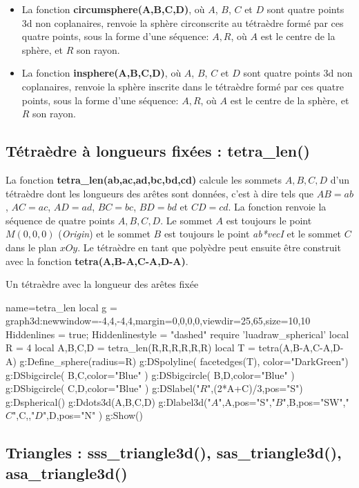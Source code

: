 \begin{itemize}
    \item La fonction \textbf{circumsphere(A,B,C,D)}, où $A$, $B$, $C$ et $D$ sont quatre points 3d non coplanaires, renvoie la sphère circonscrite au tétraèdre formé par ces quatre points, sous la forme d'une séquence: $A,R$, où $A$ est le centre de la sphère, et $R$ son rayon.
    \item La fonction \textbf{insphere(A,B,C,D)}, où $A$, $B$, $C$ et $D$ sont quatre points 3d non coplanaires, renvoie la sphère inscrite dans le tétraèdre formé par ces quatre points, sous la forme d'une séquence: $A,R$, où $A$ est le centre de la sphère, et $R$ son rayon.
\end{itemize}

\subsection{Tétraèdre à longueurs fixées : tetra\_len()}

La fonction \textbf{tetra\_len(ab,ac,ad,bc,bd,cd)} calcule les sommets $A,B,C,D$ d'un tétraèdre dont les longueurs des arêtes sont données, c'est à dire tels que $AB=ab$, $AC=ac$, $AD=ad$, $BC=bc$, $BD=bd$ et $CD=cd$. La fonction renvoie la séquence de quatre points $A,B,C,D$. Le sommet $A$ est toujours le point $M(0,0,0)$ (\emph{Origin}) et le sommet $B$ est toujours le point \emph{ab*vecI} et le sommet $C$ dans le plan $xOy$. Le tétraèdre en tant que polyèdre peut ensuite être construit avec la fonction \textbf{tetra(A,B-A,C-A,D-A)}.

\begin{demo}{Un tétraèdre avec la longueur des arêtes fixée}
\begin{luadraw}{name=tetra_len}
local g = graph3d:new{window={-4,4,-4,4},margin={0,0,0,0},viewdir={25,65},size={10,10}}
Hiddenlines = true; Hiddenlinestyle = "dashed"
require 'luadraw_spherical'
local R = 4
local A,B,C,D = tetra_len(R,R,R,R,R,R)
local T = tetra(A,B-A,C-A,D-A)
g:Define_sphere({radius=R})
g:DSpolyline( facetedges(T), {color="DarkGreen"})
g:DSbigcircle( {B,C},{color="Blue"} )
g:DSbigcircle( {B,D},{color="Blue"} )
g:DSbigcircle( {C,D},{color="Blue"}  )
g:DSlabel("$R$",(2*A+C)/3,{pos="S"})
g:Dspherical()
g:Ddots3d({A,B,C,D})
g:Dlabel3d("$A$",A,{pos="S"},"$B$",B,{pos="SW"},"$C$",C,{},"$D$",D,{pos="N"} )
g:Show()
\end{luadraw}
\end{demo}

\subsection{Triangles : sss\_triangle3d(), sas\_triangle3d(), asa\_triangle3d()}

